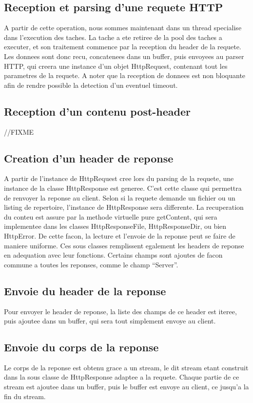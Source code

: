 \subsection{Reception et parsing d'une requete HTTP}
A partir de cette operation, nous sommes maintenant dans un thread specialise dans l'execution des taches.
La tache a ete retiree de la pool des taches a executer, et son traitement commence par la reception du header de la requete.
Les donnees sont donc recu, concatenees dans un buffer, puis envoyees au parser HTTP, qui creera une instance d'un objet HttpRequest, contenant tout les parametres de la requete.
A noter que la reception de donnees est non bloquante afin de rendre possible la detection d'un eventuel timeout.

\subsection {Reception d'un contenu post-header}
//FIXME

\subsection {Creation d'un header de reponse}
A partir de l'instance de HttpRequest cree lors du parsing de la requete, une instance de la classe HttpResponse est generee. C'est cette classe qui permettra de renvoyer la reponse au client.
Selon si la requete demande un fichier ou un listing de repertoire, l'instance de HttpResponse sera differente. La recuperation du conteu est assure par la methode virtuelle pure getContent, qui sera implementee dans les classes HttpResponseFile, HttpResponseDir, ou bien HttpError.
De cette facon, la lecture et l'envoie de la reponse peut se faire de maniere uniforme.
Ces sous classes remplissent egalement les headers de reponse en adequation avec leur fonctions.
Certains champs sont ajoutes de facon commune a toutes les reponses, comme le champ ``Server''.

\subsection {Envoie du header de la reponse}
Pour envoyer le header de reponse, la liste des champs de ce header est iteree, puis ajoutee dans un buffer, qui sera tout simplement envoye au client.

\subsection {Envoie du corps de la reponse}
Le corps de la reponse est obtenu grace a un stream, le dit stream etant construit dans la sous classe de HttpResponse adaptee a la requete.
Chaque partie de ce stream est ajoutee dans un buffer, puis le buffer est envoye au client, ce jusqu'a la fin du stream.

